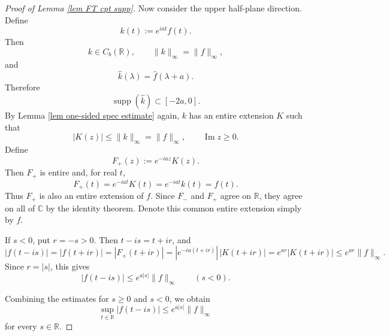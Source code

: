 \documentclass[12pt]{amsart}
\theoremstyle{definition}
\begin{document}
\begin{proof}[Proof of Lemma \ref{lem FT cpt supp}]
Now consider the upper half-plane direction. Define
\[
        k(t):=e^{iat}f(t).
\]
Then
\[
        k\in C_b(\mathbb R),
        \qquad
        \|k\|_\infty=\|f\|_\infty,
\]
and
\[
        \widehat k(\lambda)
        =
        \widehat f(\lambda+a).
\]
Therefore
\[
        \operatorname{supp}(\widehat k)
        \subset [-2a,0].
\]
By Lemma \ref{lem one-sided spec estimate} again, \(k\) has an entire extension \(K\) such
that
\[
        |K(z)|\le \|k\|_\infty=\|f\|_\infty,
        \qquad \operatorname{Im}z\ge 0.
\]
Define
\[
        F_+(z):=e^{-iaz}K(z).
\]
Then \(F_+\) is entire and, for real \(t\),
\[
        F_+(t)
        =
        e^{-iat}K(t)
        =
        e^{-iat}k(t)
        =
        f(t).
\]
Thus \(F_+\) is also an entire extension of \(f\). Since \(F_-\) and \(F_+\)
agree on \(\mathbb R\), they agree on all of \(\mathbb C\) by the identity
theorem. Denote this common entire extension simply by \(f\).

If \(s<0\), put \(r=-s>0\). Then \(t-is=t+ir\), and
\[
        |f(t-is)|
        =
        |f(t+ir)|
        =
        |F_+(t+ir)|
        =
        |e^{-ia(t+ir)}|\,|K(t+ir)|
        =
        e^{ar}|K(t+ir)|
        \le
        e^{ar}\|f\|_\infty.
\]
Since \(r=|s|\), this gives
\[
        |f(t-is)|
        \le
        e^{a|s|}\|f\|_\infty
        \qquad (s<0).
\]

Combining the estimates for \(s\ge 0\) and \(s<0\), we obtain
\[
        \sup_{t\in\mathbb R}|f(t-is)|
        \le
        e^{a|s|}\|f\|_\infty
\]
for every \(s\in\mathbb R\).
\end{proof}
\end{document}
